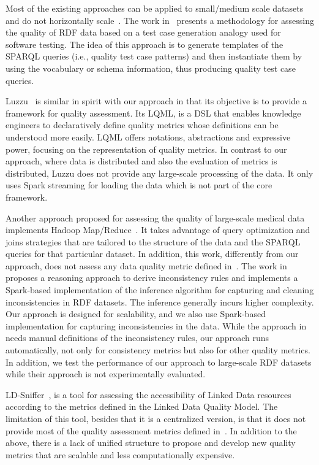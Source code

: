 Most of the existing approaches can be applied to small/medium scale datasets and do not horizontally scale~\cite{debattista2016luzzu, KontokostasWAHLCZ14}. 
The work in~\cite{KontokostasWAHLCZ14} presents a methodology for assessing the quality of \gls{RDF} data based on a test case generation analogy used for software testing. 
The idea of this approach is to generate templates of the \gls{SPARQL} queries (i.e., quality test case patterns) and then instantiate them by using the vocabulary or schema information, thus producing quality test case queries. 

Luzzu~\cite{debattista2016luzzu} is similar in spirit with our approach in that its objective is to provide a framework for quality assessment.
Its \gls{LQML}, is a \gls{DSL} that enables knowledge engineers to declaratively define quality metrics whose definitions can be understood more easily. 
\gls{LQML} offers notations, abstractions and expressive power, focusing on the representation of quality metrics.
In contrast to our approach, where data is distributed and also the evaluation of metrics is distributed, Luzzu does not provide any large-scale processing of the data. 
It only uses Spark streaming for loading the data which is not part of the core framework. 

Another approach proposed for assessing the quality of large-scale medical data implements Hadoop Map/Reduce~\cite{BonnerMKBTMCA15}. 
It takes advantage of query optimization and joins strategies that are tailored to the structure of the data and the \gls{SPARQL} queries for that particular dataset. In addition, this work, differently from our approach, does not assess any data quality metric defined in~\cite{zaveri2015quality}.
The work in~\cite{BenbernouO17} proposes a reasoning approach to derive inconsistency rules and implements a Spark-based implementation of the inference algorithm for capturing and cleaning inconsistencies in \gls{RDF} datasets.
The inference generally incurs higher complexity. Our approach is designed for scalability, and we also use Spark-based implementation for capturing inconsistencies in the data.
While the approach in~\cite{BenbernouO17} needs manual definitions of the inconsistency rules, our approach runs automatically, not only for consistency metrics but also for other quality metrics. 
In addition, we test the performance of our approach to large-scale \gls{RDF} datasets while their approach is not experimentally evaluated.

LD-Sniffer~\cite{Mihindukulasooriya2016LDSA}, is a tool for assessing the accessibility of Linked Data resources according to the metrics defined in the Linked Data Quality Model. 
The limitation of this tool, besides that it is a centralized version, is that it does not provide most of the quality assessment metrics defined in~\cite{zaveri2015quality}. 
In addition to the above, there is a lack of unified structure to propose and develop new quality metrics that are scalable and less computationally expensive.

